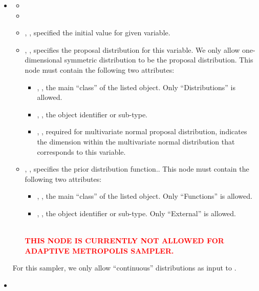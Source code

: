 \begin{itemize}
  \item \variableDescription
    \variableChildrenIntro
    \begin{itemize}
      \item \distributionDescription
      \item \functionDescription
      \item {}, , specified the initial value for given variable.
      \item {}, , specifies the proposal distribution for this variable.
      \nb We only allow one-dimensional symmetric distribution to be the proposal distribution.
      This node must contain the following two attributes:
      \begin{itemize}
        \item {}, , the main
          ``class'' of the listed object. Only ``Distributions'' is allowed.
        \item {},  , the object
          identifier or sub-type.
        \item {}, , required for
        multivariate normal proposal distribution, indicates the dimension within the multivariate
        normal distribution that corresponds to this variable.
      \end{itemize}
      \item {}, , specifies the prior distribution function..
      This node must contain the following two attributes:
      \begin{itemize}
        \item {}, , the main
          ``class'' of the listed object. Only ``Functions'' is allowed.
        \item {},  , the object
          identifier or sub-type. Only ``External'' is allowed.
      \end{itemize}
      \textcolor{red}{\\\textbf{THIS NODE IS CURRENTLY NOT ALLOWED FOR ADAPTIVE METROPOLIS SAMPLER.}}
    \end{itemize}
    \nb For this sampler, we only allow ``continuous'' distributions as input to .
    \item \constantVariablesDescription
\end{itemize}

